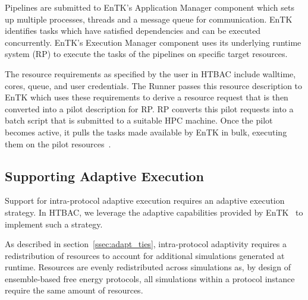 Pipelines are submitted to EnTK's Application Manager component which sets up
multiple processes, threads and a message queue for communication. EnTK
identifies tasks which have satisfied dependencies and can be executed
concurrently. EnTK's Execution Manager component uses its underlying runtime
system (RP) to execute the tasks of the pipelines on specific target
resources.

The resource requirements as specified by the user in HTBAC include
walltime, cores, queue, and user credentials. The Runner passes this resource 
description to EnTK which uses these requirements to derive a resource request 
that is then converted into a pilot description for RP. RP converts this pilot
requests into a batch script that is submitted to a suitable HPC machine.
Once the pilot becomes active, it pulls the tasks made available by EnTK in
bulk, executing them on the pilot resources~\cite{merzky2015radical}.


\subsection{Supporting Adaptive Execution}\label{ssec:adaptive_execution}

Support for intra-protocol adaptive execution requires an adaptive execution
strategy. In HTBAC, we leverage the adaptive capabilities provided by
EnTK~\cite{adaptivebiomolecular} to implement such a strategy. 

As described in section~\ref{ssec:adapt_ties}, intra-protocol adaptivity
requires a redistribution of resources to account for additional simulations
generated at runtime. Resources are evenly redistributed across simulations
as, by design of ensemble-based free energy protocols, all simulations within
a protocol instance require the same amount of resources.


